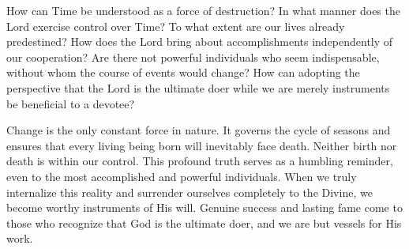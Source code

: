\newpage
\begin{mananam}{}
\normalfont\mananamtext How can Time be understood as a force of destruction? In what manner does the Lord exercise control over Time? To what extent are our lives already predestined? 
How does the Lord bring about accomplishments independently of our cooperation? Are there not powerful individuals who seem indispensable, without whom the course of events would change? How can adopting the perspective that the Lord is the ultimate doer while we are merely instruments be beneficial to a devotee?
\end{mananam}
\sreflect
\begin{inspiration}{}
\normalfont\mananamtext Change is the only constant force in nature. It governs the cycle of seasons and ensures that every living being born will inevitably face death. Neither birth nor death is within our control. This profound truth serves as a humbling reminder, even to the most accomplished and powerful individuals. When we truly internalize this reality and surrender ourselves completely to the Divine, we become worthy instruments of His will. Genuine success and lasting fame come to those who recognize that God is the ultimate doer, and we are but vessels for His work.
\end{inspiration}
\newpage

